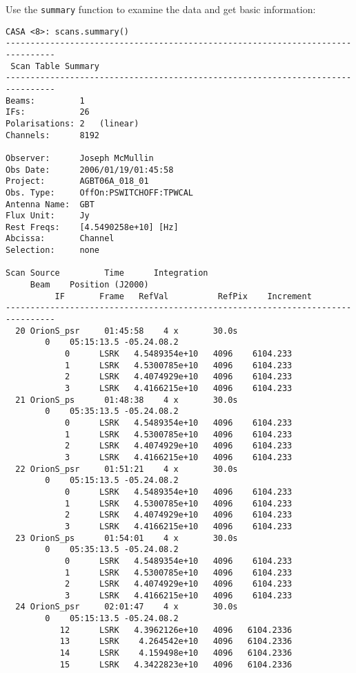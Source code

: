 Use the {\tt summary} function to examine the data and get basic information:

\small
\begin{verbatim}
CASA <8>: scans.summary()
--------------------------------------------------------------------------------
 Scan Table Summary
--------------------------------------------------------------------------------
Beams:         1   
IFs:           26  
Polarisations: 2   (linear)
Channels:      8192

Observer:      Joseph McMullin
Obs Date:      2006/01/19/01:45:58
Project:       AGBT06A_018_01
Obs. Type:     OffOn:PSWITCHOFF:TPWCAL
Antenna Name:  GBT
Flux Unit:     Jy
Rest Freqs:    [4.5490258e+10] [Hz]
Abcissa:       Channel
Selection:     none

Scan Source         Time      Integration       
     Beam    Position (J2000)
          IF       Frame   RefVal          RefPix    Increment   
--------------------------------------------------------------------------------
  20 OrionS_psr     01:45:58    4 x       30.0s
        0    05:15:13.5 -05.24.08.2
            0      LSRK   4.5489354e+10   4096    6104.233
            1      LSRK   4.5300785e+10   4096    6104.233
            2      LSRK   4.4074929e+10   4096    6104.233
            3      LSRK   4.4166215e+10   4096    6104.233
  21 OrionS_ps      01:48:38    4 x       30.0s
        0    05:35:13.5 -05.24.08.2
            0      LSRK   4.5489354e+10   4096    6104.233
            1      LSRK   4.5300785e+10   4096    6104.233
            2      LSRK   4.4074929e+10   4096    6104.233
            3      LSRK   4.4166215e+10   4096    6104.233
  22 OrionS_psr     01:51:21    4 x       30.0s
        0    05:15:13.5 -05.24.08.2
            0      LSRK   4.5489354e+10   4096    6104.233
            1      LSRK   4.5300785e+10   4096    6104.233
            2      LSRK   4.4074929e+10   4096    6104.233
            3      LSRK   4.4166215e+10   4096    6104.233
  23 OrionS_ps      01:54:01    4 x       30.0s
        0    05:35:13.5 -05.24.08.2
            0      LSRK   4.5489354e+10   4096    6104.233
            1      LSRK   4.5300785e+10   4096    6104.233
            2      LSRK   4.4074929e+10   4096    6104.233
            3      LSRK   4.4166215e+10   4096    6104.233
  24 OrionS_psr     02:01:47    4 x       30.0s
        0    05:15:13.5 -05.24.08.2
           12      LSRK   4.3962126e+10   4096   6104.2336
           13      LSRK    4.264542e+10   4096   6104.2336
           14      LSRK    4.159498e+10   4096   6104.2336
           15      LSRK   4.3422823e+10   4096   6104.2336

\end{verbatim}

